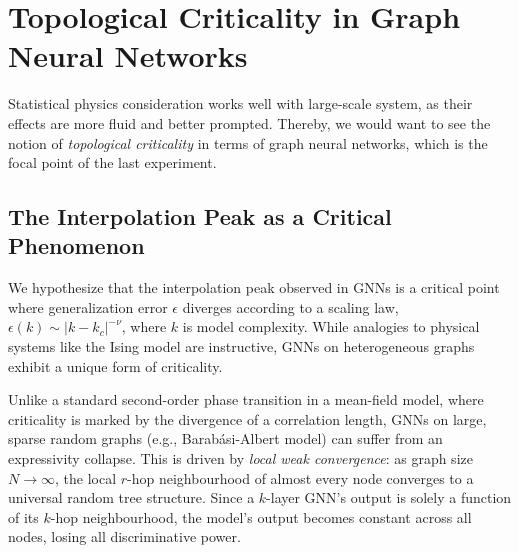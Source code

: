 \documentclass{article}
\begin{document}
\section{Topological Criticality in Graph Neural Networks}
Statistical physics consideration works well with large-scale system, as their effects are more fluid and better prompted. Thereby, we would want to see the notion of \textit{topological criticality} in terms of graph neural networks, which is the focal point of the last experiment.
\subsection{The Interpolation Peak as a Critical Phenomenon}
We hypothesize that the interpolation peak observed in GNNs is a critical point where generalization error $\epsilon$ diverges according to a scaling law, $\epsilon(k) \sim |k - k_c|^{-\nu}$, where $k$ is model complexity. While analogies to physical systems like the Ising model are instructive, GNNs on heterogeneous graphs exhibit a unique form of criticality.

Unlike a standard second-order phase transition in a mean-field model, where criticality is marked by the divergence of a correlation length, GNNs on large, sparse random graphs (e.g., Barabási-Albert model) can suffer from an expressivity collapse. This is driven by \textit{local weak convergence}: as graph size $N \to \infty$, the local $r$-hop neighbourhood of almost every node converges to a universal random tree structure. Since a $k$-layer GNN's output is solely a function of its $k$-hop neighbourhood, the model's output becomes constant across all nodes, losing all discriminative power.
\end{document}
